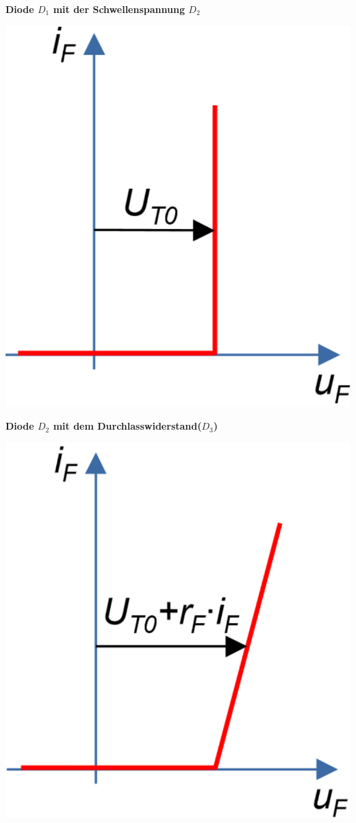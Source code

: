 \begin{multicols}{4}
    \begin{minipage}{\linewidth}
        \textbf{Diode $ D_1 $ mit der Schwellenspannung $  D_2 $} \raggedright
        \includegraphics[width=0.6\linewidth]{images/idealeDiodeSP}
    \end{minipage}
    
    \begin{minipage}{\linewidth}
        \textbf{Diode $ D_2 $ mit dem Durchlasswiderstand($ D_3 $)} \raggedright
        \includegraphics[width=0.6\linewidth]{images/idealeDiodeSPR}    
    \end{minipage}                       
\end{multicols}
